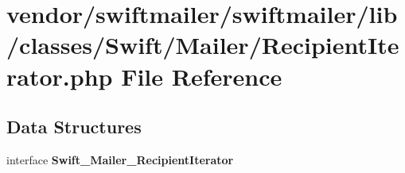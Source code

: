 \section{vendor/swiftmailer/swiftmailer/lib/classes/\+Swift/\+Mailer/\+Recipient\+Iterator.php File Reference}
\label{_recipient_iterator_8php}
\subsection*{Data Structures}
\begin{DoxyCompactItemize}
\item 
interface {\bf Swift\+\_\+\+Mailer\+\_\+\+Recipient\+Iterator}
\end{DoxyCompactItemize}
